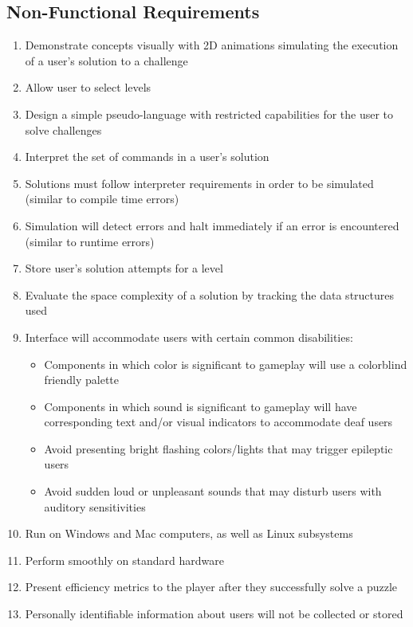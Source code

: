 \subsection{Non-Functional Requirements}
\begin{enumerate}
	\item Demonstrate concepts visually with 2D animations simulating the execution of a user’s solution to a challenge
	\item Allow user to select levels
	\item Design a simple pseudo-language with restricted capabilities for the user to solve challenges
	\item Interpret the set of commands in a user’s solution
	\item Solutions must follow interpreter requirements in order to be simulated (similar to compile time errors)
	\item Simulation will detect errors and halt immediately if an error is encountered (similar to runtime errors)
	\item Store user’s solution attempts for a level
	\item Evaluate the space complexity of a solution by tracking the data structures used
	\item Interface will accommodate users with certain common disabilities:
		\begin{itemize}
		\item Components in which color is significant to gameplay will use a colorblind friendly palette
		\item Components in which sound is significant to gameplay will have corresponding text and/or visual indicators to accommodate deaf users
		\item Avoid presenting bright flashing colors/lights that may trigger epileptic users
		\item Avoid sudden loud or unpleasant sounds that may disturb users with auditory sensitivities
		\end{itemize}
	\item Run on Windows and Mac computers, as well as Linux subsystems
	\item Perform smoothly on standard hardware
	\item Present efficiency metrics to the player after they successfully solve a puzzle
	\item Personally identifiable information about users will not be collected or stored
\end{enumerate}